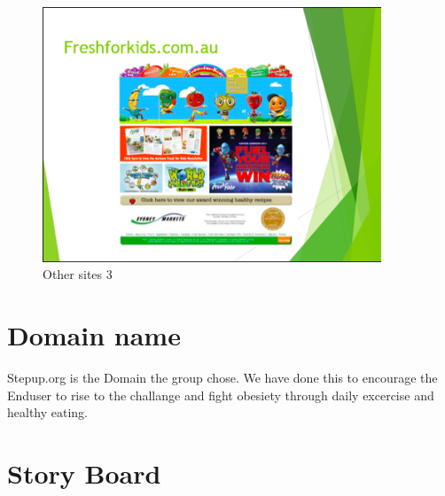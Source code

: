 \documentclass[letterpaper,12pt]{article}
\begin{document}
\begin{figure}[ht!]
  \centering
  \includegraphics[width=0.9\textwidth]{assets/jpg/othersite_3}
  \caption{Other sites 3}
  \label{fig:othersites-3}
\end{figure}
\FloatBarrier

\section{Domain name}

Stepup.org is the Domain the group chose. We have done this to encourage the Enduser to rise to the challange and fight obesiety through daily excercise and healthy eating.

\section{Story Board}
\end{document}
